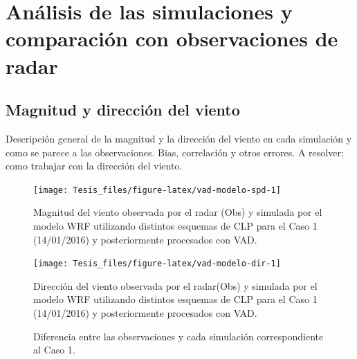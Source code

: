 \documentclass[12pt,spanish,oneside]{book}
\begin{document}
\section{Análisis de las simulaciones y comparación con observaciones de
radar}\label{analisis-de-las-simulaciones-y-comparacion-con-observaciones-de-radar}

\subsection{Magnitud y dirección del
viento}\label{magnitud-y-direccion-del-viento}

Descripción general de la magnitud y la dirección del viento en cada
simulación y como se parece a las observaciones. Bias, correlación y
otros errores. A resolver: como trabajar con la dirección del viento.

\begin{figure}

{\centering \texttt{[image: Tesis\_files/figure-latex/vad-modelo-spd-1]} 

}

\caption{Magnitud del viento observada por el radar (Obs) y simulada por el modelo WRF utilizando distintos esquemas de CLP para el Caso 1 (14/01/2016) y posteriormente procesados con VAD. \label{modelo-spd}}\label{fig:vad-modelo-spd}
\end{figure}

\begin{figure}

{\centering \texttt{[image: Tesis\_files/figure-latex/vad-modelo-dir-1]} 

}

\caption{Dirección del viento observada por el radar(Obs) y simulada por el modelo WRF utilizando distintos esquemas de CLP para el Caso 1 (14/01/2016) y posteriormente procesados con VAD. \label{modelo-dir}}\label{fig:vad-modelo-dir}
\end{figure}

\begin{figure}
\caption{Diferencia entre las observaciones y cada simulación  correspondiente al Caso 1. \label{dif}}\label{fig:diferencia}
\end{figure}
\end{document}
